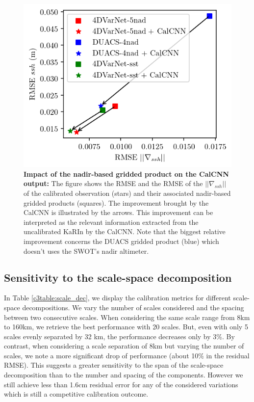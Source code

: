 \begin{bibunit}
\begin{figure}
    \begin{center}
        \includegraphics{00_Calib/gridded_impact.png}
    \end{center}
    \caption{{\bf Impact of the nadir-based gridded product on the CalCNN output:} The figure shows the RMSE and the RMSE of the $|| \nabla_{ssh} ||$ of the calibrated observation (stars) and their associated nadir-based gridded products (squares). The improvement brought by the CalCNN is illustrated by the arrows. This improvement can be interpreted as the relevant information extracted from the uncalibrated KaRIn by the CalCNN. Note that the biggest relative improvement concerns the DUACS gridded product (blue) which doesn't uses the SWOT's nadir altimeter.}
    \label{c3fig:gridded_impact}
\end{figure}

\subsection{Sensitivity to the scale-space decomposition}
\label{c3subsec:decomp_sens}
\noindent
In Table \ref{c3table:scale_dec}, we display the calibration metrics for different scale-space decompositions. We vary the number of scales considered and the spacing between two consecutive scales. When considering the same scale range from 8km to 160km, we retrieve the best performance with 20 scales. But, even with only 5 scales evenly separated by 32 km, the performance decreases only by 3\%.
By contrast, when considering a scale separation of 8km but varying the number of scales, we note a more significant drop of performance (about 10\% in the residual RMSE). This suggests a greater sensitivity to the span of the scale-space decomposition than to the number and spacing of the components. 
However we still achieve less than 1.6cm residual error for any of the considered variations which is still a competitive calibration outcome.


\end{bibunit}
